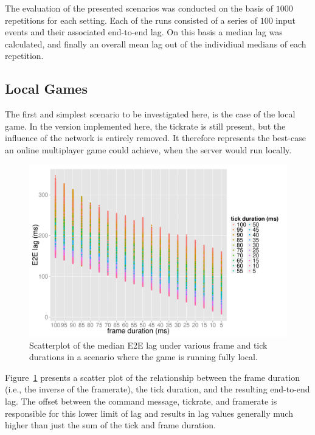 The evaluation of the presented scenarios was conducted on the basis of $1000$ repetitions for each setting. Each of the runs consisted of a series of $100$ input events and their associated end-to-end lag. On this basis a median lag was calculated, and finally an overall mean lag out of the individiual medians of each repetition.


\subsection{Local Games}

The first and simplest scenario to be investigated here, is the case of the local game. In the version implemented here, the tickrate is still present, but the influence of the network is entirely removed. It therefore represents the best-case an online multiplayer game could achieve, when the server would run locally.

\begin{figure}[!t]
	\centering
	\includegraphics[width=1.0\columnwidth]{../simulation/visualization/nwless-onlinegame-1000rounds.pdf}
	\caption{Scatterplot of the median E2E lag under various frame and tick durations in a scenario where the game is running fully local.}
\label{fig:nwless-scatter}
\end{figure}

Figure~\ref{fig:nwless-scatter} presents a scatter plot of the relationship between the frame duration (i.e., the inverse of the framerate), the tick duration, and the resulting end-to-end lag. The offset between the command message, tickrate, and framerate is responsible for this lower limit of lag and results in lag values generally much higher than just the sum of the tick and frame duration.

